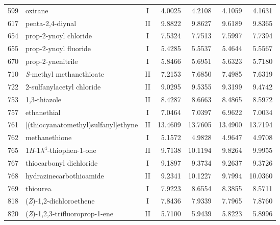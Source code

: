\begin{longtable}{rlcd{2.5}d{2.5}d{2.5}d{2.5}}
    599  & oxirane                                                & I  & 4.0025  & 4.2108  & 4.1059  & 4.1631  \\
    617  & penta-2,4-diynal                                       & II & 9.8822  & 9.8627  & 9.6189  & 9.8365  \\
    654  & prop-2-ynoyl chloride                                  & I  & 7.5324  & 7.7513  & 7.5997  & 7.7394  \\
    655  & prop-2-ynoyl fluoride                                  & I  & 5.4285  & 5.5537  & 5.4644  & 5.5567  \\
    670  & prop-2-ynenitrile                                      & I  & 5.8466  & 5.6951  & 5.6323  & 5.7180  \\
    710  & \textit{S}-methyl methanethioate                       & II & 7.2153  & 7.6850  & 7.4985  & 7.6319  \\
    722  & 2-sulfanylacetyl chloride                              & II & 9.0295  & 9.5355  & 9.3199  & 9.4742  \\
    753  & 1,3-thiazole                                           & II & 8.4287  & 8.6663  & 8.4865  & 8.5972  \\
    757  & ethanethial                                            & I  & 7.0464  & 7.0397  & 6.9622  & 7.0034  \\
    761  & [(thiocyanatomethyl)sulfanyl]ethyne                    & II & 13.4609 & 13.7605 & 13.4900 & 13.7194 \\
    762  & methanethione                                          & I  & 5.1572  & 4.9828  & 4.9647  & 4.9708  \\
    765  & 1\textit{H}-1$\lambda^4$-thiophen-1-one                & II & 9.7138  & 10.1194 & 9.8264  & 9.9955  \\
    767  & thiocarbonyl dichloride                                & I  & 9.1897  & 9.3734  & 9.2637  & 9.3726  \\
    768  & hydrazinecarbothioamide                                & II & 9.2341  & 10.1227 & 9.7994  & 10.0360 \\
    769  & thiourea                                               & I  & 7.9223  & 8.6554  & 8.3855  & 8.5711  \\
    818  & (\textit{Z})-1,2-dichloroethene                        & I  & 7.8436  & 7.9339  & 7.7965  & 7.8760  \\
    820  & (\textit{Z})-1,2,3-trifluoroprop-1-ene                 & II & 5.7100  & 5.9439  & 5.8223  & 5.8996  \\

\end{longtable}

